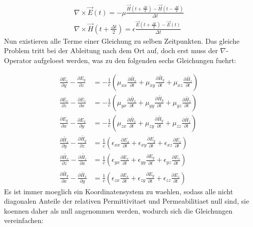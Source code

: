 \documentclass[11pt, ngerman]{article}
\begin{document}
\begin{align}
	\nabla\times\vec{E}(t) = -\mu\frac{\vec{H}(t+\frac{\Delta t}{2})-\vec{H}(t-\frac{\Delta t}{2})}{\Delta t}\\
	\nabla\times\vec{H}(t + \frac{\Delta t}{2}) = \epsilon\frac{\vec{E}(t+\frac{\Delta t}{2})-\vec{E}(t)}{\Delta t}
\end{align}
Nun existieren alle Terme einer Gleichung zu selben Zeitpunkten. Das gleiche Problem tritt bei der Ableitung nach dem
Ort auf, doch erst muss der \(\nabla\)-Operator aufgeloest werden, was zu den folgenden sechs Gleichungen fuehrt:

\begin{align}
	\frac{\partial E_z}{\partial y} - \frac{\partial E_y}{\partial z} &= -\frac{1}{c}(\mu_{xx}\frac{\partial\widetilde{H_x}}{\partial t}
		+ \mu_{xy}\frac{\partial\widetilde{H_y}}{\partial t}
		+ \mu_{xz}\frac{\partial\widetilde{H_z}}{\partial t})\\
	\frac{\partial E_x}{\partial z} - \frac{\partial E_z}{\partial x} &= -\frac{1}{c}(\mu_{yx}\frac{\partial\widetilde{H_x}}{\partial t}
		+ \mu_{yy}\frac{\partial\widetilde{H_y}}{\partial t}
		+ \mu_{yz}\frac{\partial\widetilde{H_z}}{\partial t})\\
	\frac{\partial E_y}{\partial x} - \frac{\partial E_x}{\partial y} &= -\frac{1}{c}(\mu_{zx}\frac{\partial\widetilde{H_x}}{\partial t}
		+ \mu_{zy}\frac{\partial\widetilde{H_y}}{\partial t}
		+ \mu_{zz}\frac{\partial\widetilde{H_z}}{\partial t})\\
	\frac{\partial \widetilde{H_z}}{\partial y} - \frac{\partial\widetilde{H_y}}{\partial z} &= \frac{1}{c}(\epsilon_{xx}\frac{\partial E_x}{\partial t}
		+ \epsilon_{xy}\frac{\partial E_y}{\partial t}
		+ \epsilon_{xz}\frac{\partial E_z}{\partial t})\\
	\frac{\partial \widetilde{H_x}}{\partial z} - \frac{\partial \widetilde{H_z}}{\partial x} &= \frac{1}{c}(\epsilon_{yx}\frac{\partial E_x}{\partial t}
		+ \epsilon_{yy}\frac{\partial E_y}{\partial t}
		+ \epsilon_{yz}\frac{\partial E_z}{\partial t})\\
	\frac{\partial \widetilde{H_y}}{\partial x} - \frac{\partial\widetilde{H_x}}{\partial y} &= \frac{1}{c}(\epsilon_{zx}\frac{\partial E_x}{\partial t}
		+ \epsilon_{zy}\frac{\partial E_y}{\partial t}
		+ \epsilon_{zz}\frac{\partial E_z}{\partial t})
\end{align}
Es ist immer moeglich ein Koordinatensystem zu waehlen, sodass alle nicht diagonalen Anteile der relativen Permittivitaet und Permeabilitiaet null sind,
sie koennen daher als null angenommen werden, wodurch sich die Gleichungen vereinfachen\cite{diagonal_tensors}:
\end{document}
